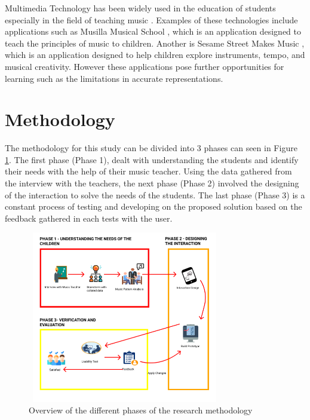 Multimedia Technology has been widely used in the education of students especially in the field of teaching music \cite{tong2016design}. Examples of these technologies include applications such as Musilla Musical School \cite{educationalappstore2017}, which is an application designed to teach the principles of music to children. Another is Sesame Street Makes Music \cite{educationalappstore2015}, which is an application designed to help children explore instruments, tempo, and musical creativity. However these applications pose further opportunities for learning such as the limitations in accurate representations.

\section{Methodology}
The methodology for this study can be divided into 3 phases can seen in Figure \ref{fig:research_framework}. The first phase (Phase 1), dealt with understanding the students and identify their needs with the help of their music teacher. Using the data gathered from the interview with the teachers, the next phase (Phase 2) involved the designing of the interaction to solve the needs of the students. The last phase (Phase 3) is a constant process of testing and developing on the proposed solution based on the feedback gathered in each tests with the user.

\begin{figure}[H]
    \centering
    \includegraphics[width=8.5cm,height=7.5cm]{NewFigures/ResFramework.png}
    \caption{Overview of the different phases of the research methodology}
    \label{fig:research_framework}
\end{figure}


